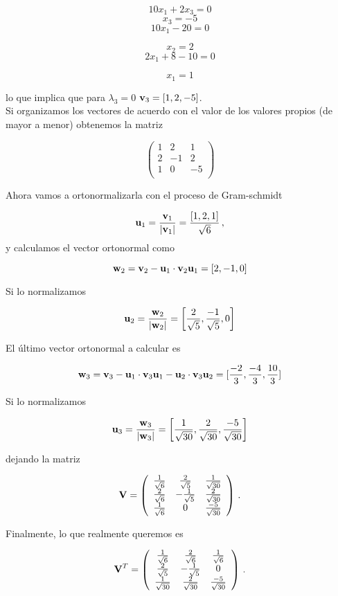 \documentclass[
]{agujournal2019}
\begin{document}
\[10x_1+2x_3=0\] \[x_3=-5\] \[10x_1-20=0\]

\[x_2=2\] \[2x_1+8-10=0\]

\[x_1=1\]

lo que implica que para \(\lambda_3=0\) \({\textbf v}_3=[1,2,-5]\).\\

Si organizamos los vectores de acuerdo con el valor de los valores
propios (de mayor a menor) obtenemos la matriz

\[\left(\begin{array}{ccc}
  1 & 2 & 1 \\
  2 & -1 & 2\\
  1 & 0 & -5\\
      \end{array}\right)\]

Ahora vamos a ortonormalizarla con el proceso de Gram-schmidt

\[{\textbf u}_1=\frac{{\textbf v}_1}{|{\textbf v}_1|}=\frac{[1,2,1]}{\sqrt{6}}\,,\]
y calculamos el vector ortonormal como

\[{\textbf w}_2={\textbf v}_2-{\textbf u}_1\cdot{\textbf v}_2{\textbf u}_1=[2,-1,0]\]

Si lo normalizamos

\[{\textbf u}_2=\frac{{\textbf w}_2}{|{\textbf w}_2|}=\left[ \frac{2}{\sqrt{5}}, \frac{-1}{\sqrt{5}} , 0 \right]\]

El último vector ortonormal a calcular es

\[{\textbf w}_3={\textbf v}_3-{\textbf u}_1\cdot{\textbf v}_3{\textbf u}_1 - {\textbf u}_2\cdot{\textbf v}_3{\textbf u}_2=[\frac{-2}{3},\frac{-4}{3},\frac{10}{3}]\]

Si lo normalizamos

\[{\textbf u}_3=\frac{{\textbf w}_3}{|{\textbf w}_3|}=\left[ \frac{1}{\sqrt{30}}, \frac{2}{\sqrt{30}} , \frac{-5}{\sqrt{30}} \right]\]

dejando la matriz

\[{\textbf V}=\left(\begin{array}{ccc}
  \frac{1}{\sqrt{6}} & \frac{2}{\sqrt{5}} & \frac{1}{\sqrt{30}}\\
  \frac{2}{\sqrt{6}} & -\frac{1}{\sqrt{5}} & \frac{2}{\sqrt{30}}\\
  \frac{1}{\sqrt{6}} & 0 & \frac{-5}{\sqrt{30}}
      \end{array}\right)\,.\]

Finalmente, lo que realmente queremos es

\[{\textbf V}^T=\left(\begin{array}{ccc}
  \frac{1}{\sqrt{6}} & \frac{2}{\sqrt{6}} & \frac{1}{\sqrt{6}}\\
  \frac{2}{\sqrt{5}} & -\frac{1}{\sqrt{5}} & 0\\
  \frac{1}{\sqrt{30}} & \frac{2}{\sqrt{30}} & \frac{-5}{\sqrt{30}}\\
      \end{array}\right)\,.\]
\end{document}
